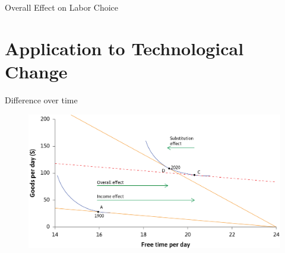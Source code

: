 \documentclass[11pt,aspectratio=43,usenames,dvipsnames]{beamer}
\theoremstyle{definition}
\begin{document}
\begin{frame}{Overall Effect on Labor Choice}
\begin{center}
    \end{center}

\end{frame}

\section[Application]{Application to Technological Change}
\label{sec:Application_to_Technological_Change}

\begin{frame}{Difference over time}
\label{slide:Difference_over_time}
    \begin{figure}
        \centering
        \includegraphics[width=\textwidth]{./figures/WorkdayApplication.png}
    \end{figure}
\end{frame}
\end{document}
